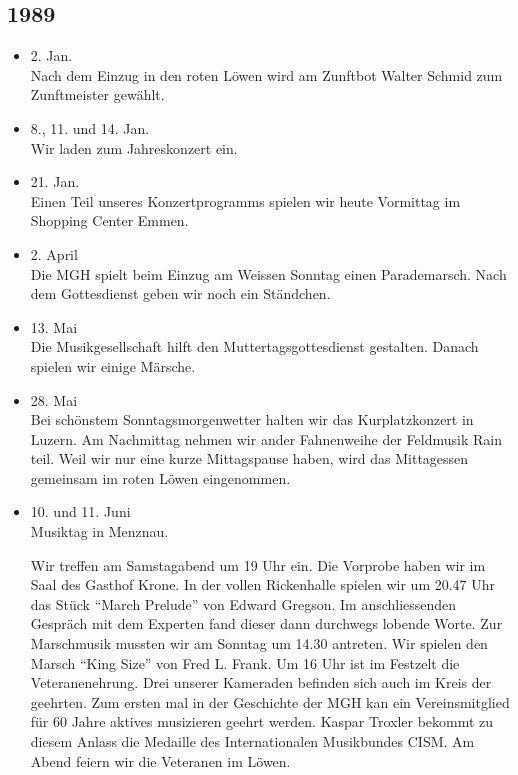 \subsection{1989}

\begin{history}


    \begin{itemize}

        \item 2. Jan.\\
              Nach dem Einzug in den roten Löwen wird am Zunftbot Walter Schmid zum
              Zunftmeister gewählt.

        \item 8., 11. und 14. Jan.\\
              Wir laden zum Jahreskonzert ein.

        \item 21. Jan.\\
              Einen Teil unseres Konzertprogramms spielen wir heute Vormittag im
              Shopping Center Emmen.

        \item 2. April\\
              Die MGH spielt beim Einzug am Weissen Sonntag einen Parademarsch. Nach
              dem Gottesdienst geben wir noch ein Ständchen.

        \item 13. Mai\\
              Die Musikgesellschaft hilft den Muttertagsgottesdienst gestalten. Danach
              spielen wir einige Märsche.

        \item 28. Mai\\
              Bei schönstem Sonntagsmorgenwetter halten wir das Kurplatzkonzert in
              Luzern. Am Nachmittag nehmen wir ander Fahnenweihe der Feldmusik Rain
              teil. Weil wir nur eine kurze Mittagspause haben, wird das Mittagessen
              gemeinsam im roten Löwen eingenommen.

        \item 10. und 11. Juni\\
              Musiktag in Menznau.

              Wir treffen am Samstagabend um 19 Uhr ein. Die
              Vorprobe haben wir im Saal des Gasthof Krone. In der vollen Rickenhalle
              spielen wir um 20.47 Uhr das Stück \enquote{March Prelude} von Edward
              Gregson. Im anschliessenden Gespräch mit dem Experten fand dieser dann
              durchwegs lobende Worte. Zur Marschmusik mussten wir am Sonntag um 14.30
              antreten. Wir spielen den Marsch \enquote{King Size} von Fred L. Frank.
              Um 16 Uhr ist im Festzelt die Veteranenehrung. Drei unserer Kameraden
              befinden sich auch im Kreis der geehrten. Zum ersten mal in der
              Geschichte der MGH kan ein Vereinsmitglied für 60 Jahre aktives
              musizieren geehrt werden. Kaspar Troxler bekommt zu diesem Anlass die
              Medaille des Internationalen Musikbundes CISM. Am Abend feiern wir die
              Veteranen im Löwen.


\end{itemize}
\end{history}
